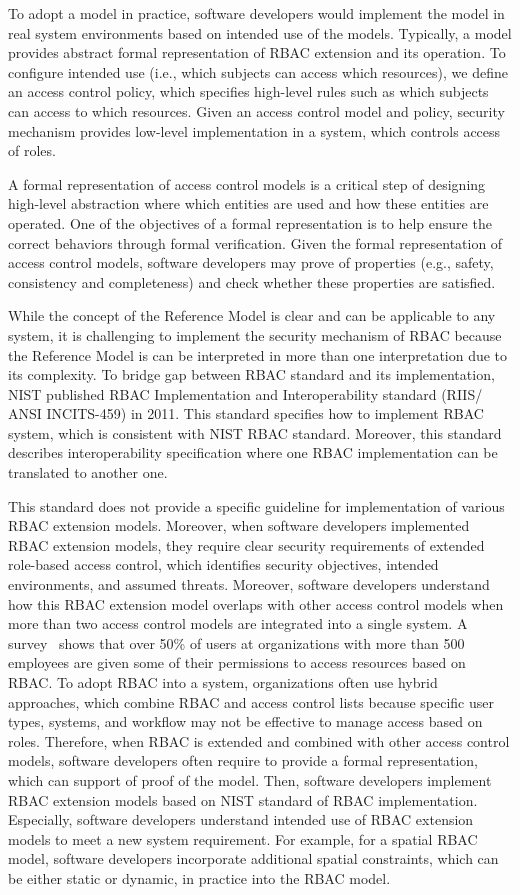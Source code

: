 To adopt a model in practice, software developers would implement the model in real system environments based on intended use of the models. Typically, a model provides abstract formal representation of RBAC extension and its operation. To configure intended use (i.e., which subjects can access which resources), we define an access control policy, which specifies high-level rules such as which subjects can access to which resources. Given an access control model and policy, security mechanism provides low-level implementation in a system, which controls access of roles.

A formal representation of access control models is a critical step of designing high-level abstraction where which entities are used and how these entities are operated.
One of the objectives of a formal representation is to help ensure the correct behaviors through formal verification. Given the formal representation of access control models, software developers may prove of properties (e.g., safety, consistency and completeness) and check whether these properties are satisfied. 

While the concept of the Reference Model is clear and can be applicable to any system, it is challenging to implement the security mechanism of RBAC because the Reference Model is can be interpreted in more than one interpretation due to its complexity. To bridge gap between RBAC standard and its implementation, NIST published RBAC Implementation and Interoperability standard (RIIS/ ANSI INCITS-459) in 2011. This standard specifies how to implement RBAC system, which is consistent with NIST RBAC standard. Moreover, this standard describes interoperability specification where one RBAC implementation can be translated to another one.

This standard does not provide a specific guideline for implementation of various RBAC extension models.
Moreover, when software developers implemented RBAC extension models, they require clear security requirements of extended role-based access control, which identifies security objectives, intended environments, and assumed threats. Moreover, software developers understand how this RBAC extension model overlaps with other access control models when more than two access control models are integrated into a single system. A survey~\cite{o20102010} shows that over 50\% of users at organizations with more than 500 employees are given some of their permissions to access resources based on RBAC. To adopt RBAC into a system, organizations often use hybrid approaches, which combine RBAC and access control lists because specific user types, systems, and workflow may not be effective to manage access based on roles. Therefore, when RBAC is extended and combined with other access control models, software developers often require to provide a formal representation, which can support of proof of the model. Then, software developers implement RBAC extension models based on NIST standard of RBAC implementation. Especially, software developers understand intended use of RBAC extension models to meet a new system requirement. For example, for a spatial RBAC model, software developers incorporate additional spatial constraints, which can be either static or dynamic, in practice into the RBAC model.


